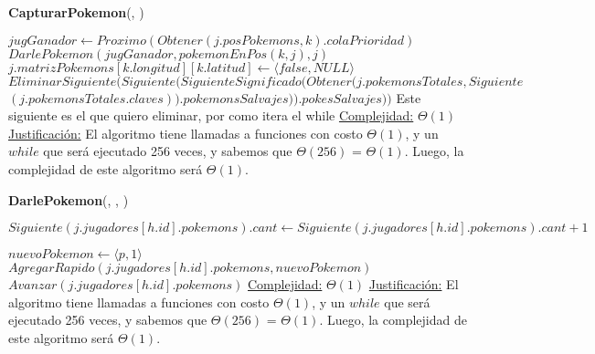 \begin{algorithm}[H]{\textbf{CapturarPokemon}(, )} 
    \begin{algorithmic}[1]
            \State $jugGanador \gets Proximo(Obtener(j.posPokemons, k).colaPrioridad)$
            \State $DarlePokemon(jugGanador, pokemonEnPos(k,j), j)$
            \State $j.matrizPokemons[k.longitud][k.latitud] \gets \langle false, NULL \rangle$
            \State $EliminarSiguiente(Siguiente(SiguienteSignificado(Obtener(j.pokemonsTotales, Siguiente$ $(j.pokemonsTotales.claves)).pokemonsSalvajes)).pokesSalvajes))$ \Comment Este siguiente es el que quiero eliminar, por como itera el while
        \EndIf
        \medskip
        \Statex \underline{Complejidad:} $\Theta(1)$
        \Statex \underline{Justificación:}  El algoritmo tiene llamadas a funciones con costo $\Theta(1)$, y un $while$ que será ejecutado 256 veces, y sabemos que $\Theta (256)$ = $\Theta (1)$. Luego, la complejidad de este algoritmo será $\Theta (1)$.
    \end{algorithmic}
\end{algorithm} 

\begin{algorithm}[H]{\textbf{DarlePokemon}(, , )}   
    \begin{algorithmic}[1]
                \State $Siguiente(j.jugadores[h.id].pokemons).cant \gets Siguiente(j.jugadores[h.id].pokemons).cant + 1$
            \EndIf
            
                \State $nuevoPokemon \gets \langle p, 1 \rangle$
                \State $AgregarRapido(j.jugadores[h.id].pokemons, nuevoPokemon)$
            \EndIf
            \State $Avanzar(j.jugadores[h.id].pokemons)$
        \EndWhile
        \medskip
        \Statex \underline{Complejidad:} $\Theta(1)$
        \Statex \underline{Justificación:}  El algoritmo tiene llamadas a funciones con costo $\Theta(1)$, y un $while$ que será ejecutado 256 veces, y sabemos que $\Theta (256)$ = $\Theta (1)$. Luego, la complejidad de este algoritmo será $\Theta (1)$.
    \end{algorithmic}
\end{algorithm} 


